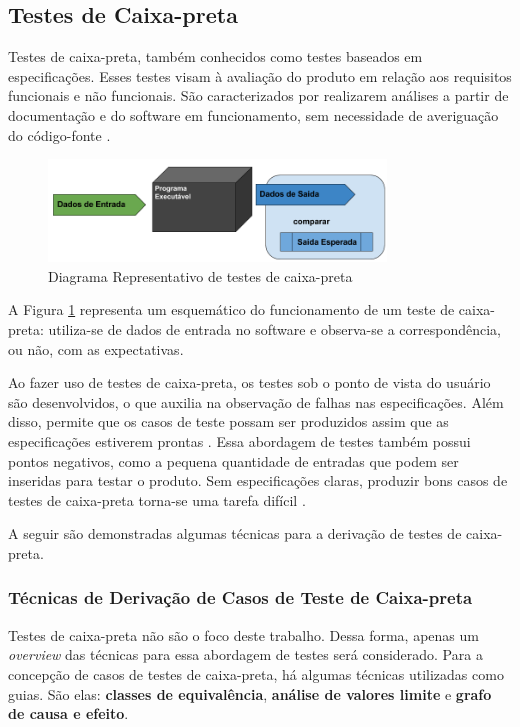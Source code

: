 \subsection{Testes de Caixa-preta}
Testes de caixa-preta, também conhecidos como testes baseados em
especificações. Esses testes visam à avaliação do produto em relação aos
requisitos funcionais e não funcionais. São caracterizados por realizarem
análises a partir de documentação e do software em funcionamento, sem
necessidade de averiguação do código-fonte \cite{barbosaEtAl2009}.

\begin{figure}[h]
  \centering
    \includegraphics[width=0.8\textwidth]{figuras/test_black_box.png}
    \caption{Diagrama Representativo de testes de caixa-preta}
    \label{test_black_box}
\end{figure}

A Figura \ref{test_black_box} representa um esquemático do funcionamento de um
teste de caixa-preta: utiliza-se de dados de entrada no software e observa-se a
correspondência, ou não, com as expectativas.
\par
\indent Ao fazer uso de testes de caixa-preta, os testes sob o ponto de vista
do usuário são desenvolvidos, o que auxilia na observação de falhas nas
especificações. Além disso, permite que os casos de teste possam ser produzidos
assim que as especificações estiverem prontas \cite{stf2010}. Essa abordagem de
testes também possui pontos negativos, como a pequena quantidade de entradas
que podem ser inseridas para testar o produto. Sem especificações claras,
produzir bons casos de testes de caixa-preta torna-se uma tarefa difícil
\cite{stf2010}.
\par
\indent A seguir são demonstradas algumas técnicas para a derivação de testes
de caixa-preta.

\subsubsection{Técnicas de Derivação de Casos de Teste de Caixa-preta}
Testes de caixa-preta não são o foco deste trabalho. Dessa forma, apenas um
\textit{overview} das técnicas para essa abordagem de testes será considerado.
Para a concepção de casos de testes de caixa-preta, há algumas técnicas
utilizadas como guias. São elas: \textbf{classes de equivalência},
\textbf{análise de valores limite} e \textbf{grafo de causa e efeito}.

